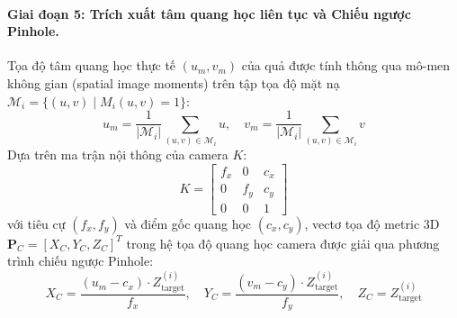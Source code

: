 \documentclass[12pt,a4paper]{article}
\begin{document}
\paragraph{Giai đoạn 5: Trích xuất tâm quang học liên tục và Chiếu ngược Pinhole.}
Tọa độ tâm quang học thực tế $(u_m, v_m)$ của quả được tính thông qua mô-men không gian (spatial image moments) trên tập tọa độ mặt nạ $\mathcal{M}_i = \{(u, v) \mid M_i(u, v) = 1\}$:
\begin{equation}
u_m = \frac{1}{|\mathcal{M}_i|} \sum_{(u, v) \in \mathcal{M}_i} u, \quad v_m = \frac{1}{|\mathcal{M}_i|} \sum_{(u, v) \in \mathcal{M}_i} v
\end{equation}
Dựa trên ma trận nội thông của camera $K$:
\begin{equation}
K = \begin{bmatrix} f_x & 0 & c_x \\ 0 & f_y & c_y \\ 0 & 0 & 1 \end{bmatrix}
\end{equation}
với tiêu cự $(f_x, f_y)$ và điểm gốc quang học $(c_x, c_y)$, vectơ tọa độ metric 3D $\mathbf{P}_C = [X_C, Y_C, Z_C]^T$ trong hệ tọa độ quang học camera được giải qua phương trình chiếu ngược Pinhole:
\begin{equation}
X_C = \frac{(u_m - c_x) \cdot Z_{\text{target}}^{(i)}}{f_x}, \quad Y_C = \frac{(v_m - c_y) \cdot Z_{\text{target}}^{(i)}}{f_y}, \quad Z_C = Z_{\text{target}}^{(i)}
\label{eq:pinhole_deprojection}
\end{equation}
\end{document}
